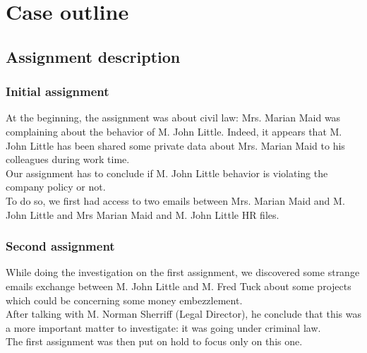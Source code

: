 \section{Case outline}
\subsection{Assignment description}

\subsubsection{Initial assignment}
At the beginning, the assignment was about civil law: Mrs. Marian Maid was complaining about the behavior of M. John Little. Indeed, it appears that M. John Little has been shared some private data about Mrs. Marian Maid to his colleagues during work time.\\
Our assignment has to conclude if M. John Little behavior is violating the company policy or not.\\
To do so, we first had access to two emails between Mrs. Marian Maid and M. John Little and Mrs Marian Maid and M. John Little HR files.

\subsubsection{Second assignment}

While doing the investigation on the first assignment, we discovered some strange emails exchange between M. John Little and M. Fred Tuck about some projects which could be concerning some money embezzlement.\\
After talking with M. Norman Sherriff (Legal Director), he conclude that this was a more important matter to investigate: it was going under criminal law.\\
The first assignment was then put on hold to focus only on this one.

